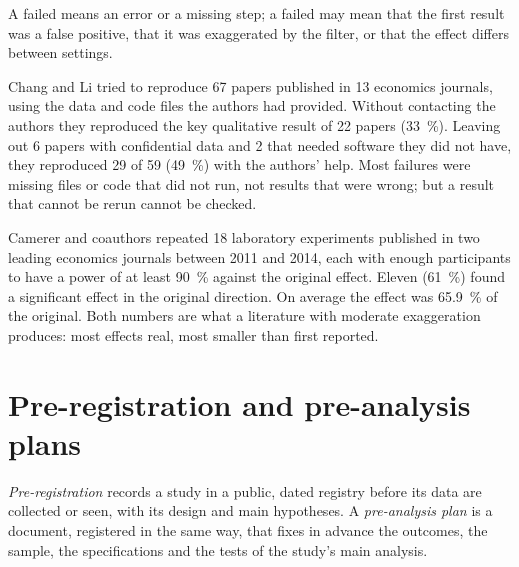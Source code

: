 A failed  means an error or a missing step; a failed 
may mean that the first result was a false positive, that it was exaggerated
by the filter, or that the effect differs between settings.

\begin{record}
Chang and Li tried to reproduce 67 papers published in 13 economics journals,
using the data and code files the authors had provided. Without contacting the
authors they reproduced the key qualitative result of 22 papers (33~\%).
Leaving out 6 papers with confidential data and 2 that needed software they did
not have, they reproduced 29 of 59 (49~\%) with the authors' help.
Most failures were missing files or code that did not run, not results that
were wrong; but a result that cannot be rerun cannot be checked.
\end{record}

\begin{record}
Camerer and coauthors repeated 18 laboratory experiments published in two
leading economics journals between 2011 and 2014, each with enough participants
to have a power of at least 90~\% against the original effect. Eleven (61~\%)
found a significant effect in the original direction. On average the 
effect was 65.9~\% of the original. %
Both numbers are what a literature with moderate exaggeration produces: most
effects real, most smaller than first reported.
\end{record}

\section{Pre-registration and pre-analysis plans}\label{sec:b3:credible-empirical-work:preregistration}

\begin{definition}\label{def:b3:credible-empirical-work:pre-registration}
\emph{Pre-registration} records a study in a public, dated registry before its
data are collected or seen, with its design and main hypotheses. A
\emph{pre-analysis plan} is a document, registered in the same way, that fixes in
advance the outcomes, the sample, the specifications and the tests of the
study's main analysis.
\end{definition}

